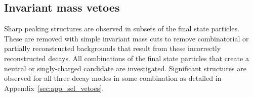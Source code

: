 \subsection{Invariant mass vetoes}
\label{sec:kinematicvetos}

Sharp peaking structures are observed in subsets of the final state particles.  
These are removed with simple invariant mass cuts to remove combinatorial or partially reconstructed backgrounds that result from these incorrectly reconstructed decays.
All combinations of the final state particles that create a neutral or singly-charged candidate are investigated.
Significant structures are observed for all three \Dsp decay modes in some combination as detailed in Appendix~\ref{sec:app_sel_vetoes}.







